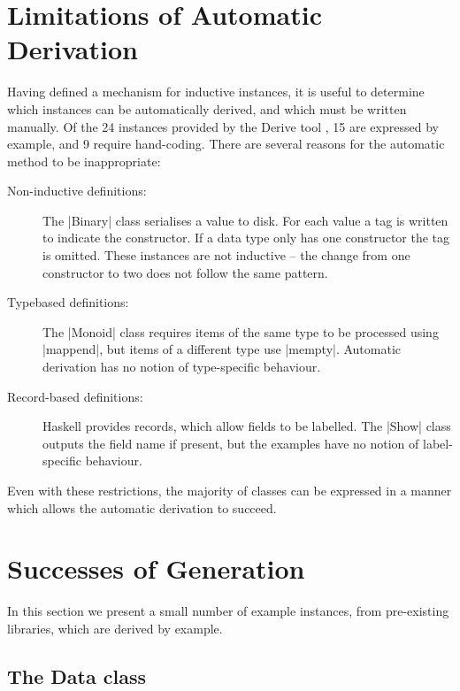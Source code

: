 \documentclass{llncs}
\begin{document}
\section{Limitations of Automatic Derivation}
\label{sec:automatic_failure}

Having defined a mechanism for inductive instances, it is useful to determine which instances can be automatically derived, and which must be written manually. Of the 24 instances provided by the Derive tool \cite{derive}, 15 are expressed by example, and 9 require hand-coding. There are several reasons for the automatic method to be inappropriate:

\begin{description}

\item[Non-inductive definitions:] The |Binary| class serialises a value to disk. For each value a tag is written to indicate the constructor. If a data type only has one constructor the tag is omitted. These instances are not inductive -- the change from one constructor to two does not follow the same pattern.

\item[Typebased definitions:] The |Monoid| class requires items of the same type to be processed using |mappend|, but items of a different type use |mempty|. Automatic derivation has no notion of type-specific behaviour.

\item [Record-based definitions:] Haskell provides records, which allow fields to be labelled. The |Show| class outputs the field name if present, but the examples have no notion of label-specific behaviour.

\end{description}

Even with these restrictions, the majority of classes can be expressed in a manner which allows the automatic derivation to succeed.

\section{Successes of Generation}
\label{sec:automatic_success}

In this section we present a small number of example instances, from pre-existing libraries, which are derived by example.

\subsection{The Data class}
\end{document}
